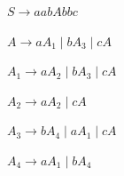 \documentclass{article}
\begin{document}
\hspace{2cm} 	$S \rightarrow aabAbbc$

\hspace{2cm} 	$A \rightarrow aA_{1} \mid bA_{3} \mid cA$

\hspace{2cm} 	$A_{1} \rightarrow aA_{2} \mid bA_{3} \mid cA$

\hspace{2cm} 	$A_{2} \rightarrow aA_{2} \mid cA$

\hspace{2cm} 	$A_{3} \rightarrow bA_{4} \mid aA_{1} \mid cA$

\hspace{2cm} 	$A_{4} \rightarrow aA_{1} \mid bA_{4}$
\end{document}

